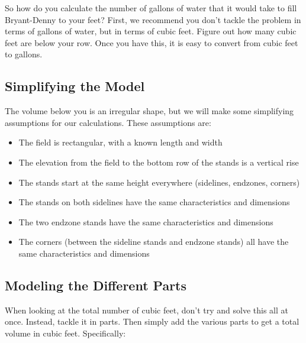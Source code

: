 \documentclass[12pt]{article}
\begin{document}
So how do you calculate the number of gallons of water that it would take to fill
Bryant-Denny to your feet?  First, we recommend you don't tackle the problem in terms
of gallons of water, but in terms of cubic feet.  Figure out how many cubic feet are
below your row.  Once you have this, it is easy to convert from cubic feet to gallons.

\subsection*{Simplifying the Model}

The volume below you is an irregular shape, but we 
will make some simplifying assumptions for our calculations.  These assumptions are:

\begin{itemize}
\item The field is rectangular, with a known length and width
\item The elevation from the field to the bottom row of the stands is a vertical rise
\item The stands start at the same height everywhere (sidelines, endzones, corners)
\item The stands on both sidelines have the same characteristics and dimensions
\item The two endzone stands have the same characteristics and dimensions
\item The corners (between the sideline stands and endzone stands) all have the same 
characteristics and dimensions
\end{itemize}

\subsection*{Modeling the Different Parts}

When looking at the total number of cubic feet, don't try and solve this all at once.
Instead, tackle it in parts.  Then simply add the various parts to get a total
volume in cubic feet.  Specifically:
\end{document}
